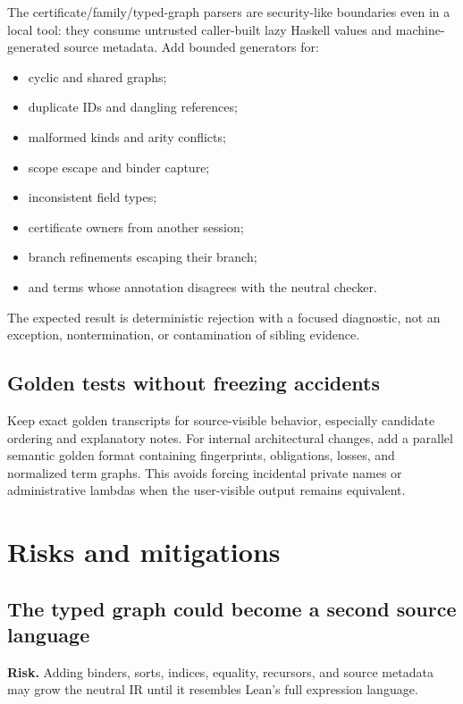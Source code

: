 \documentclass[11pt]{article}
\begin{document}
The certificate/family/typed-graph parsers are security-like boundaries even in
a local tool: they consume untrusted caller-built lazy Haskell values and
machine-generated source metadata.  Add bounded generators for:

\begin{itemize}
  \item cyclic and shared graphs;
  \item duplicate IDs and dangling references;
  \item malformed kinds and arity conflicts;
  \item scope escape and binder capture;
  \item inconsistent field types;
  \item certificate owners from another session;
  \item branch refinements escaping their branch;
  \item and terms whose annotation disagrees with the neutral checker.
\end{itemize}

The expected result is deterministic rejection with a focused diagnostic, not
an exception, nontermination, or contamination of sibling evidence.

\subsection{Golden tests without freezing accidents}

Keep exact golden transcripts for source-visible behavior, especially candidate
ordering and explanatory notes.  For internal architectural changes, add a
parallel semantic golden format containing fingerprints, obligations, losses,
and normalized term graphs.  This avoids forcing incidental private names or
administrative lambdas when the user-visible output remains equivalent.

\section{Risks and mitigations}
\label{sec:risks}

\subsection{The typed graph could become a second source language}

\textbf{Risk.}  Adding binders, sorts, indices, equality, recursors, and source
metadata may grow the neutral IR until it resembles Lean's full expression
language.
\end{document}
